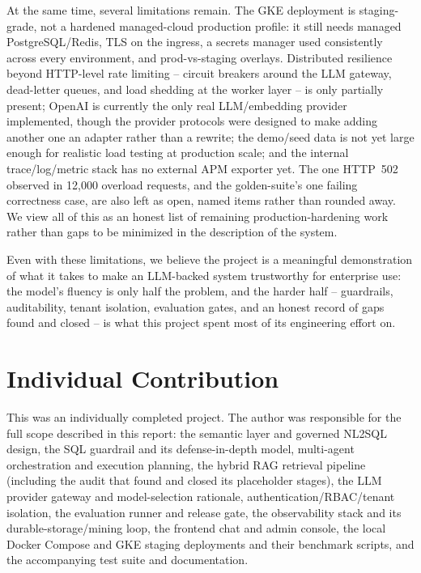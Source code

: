 \documentclass[conference]{IEEEtran}
\begin{document}
At the same time, several limitations remain. The GKE deployment is
staging-grade, not a hardened managed-cloud production profile: it still
needs managed PostgreSQL/Redis, TLS on the ingress, a secrets manager used
consistently across every environment, and prod-vs-staging overlays.
Distributed resilience beyond HTTP-level rate limiting -- circuit breakers
around the LLM gateway, dead-letter queues, and load shedding at the
worker layer -- is only partially present; OpenAI is currently the only
real LLM/embedding provider implemented, though the provider protocols
were designed to make adding another one an adapter rather than a
rewrite; the demo/seed data is not yet large enough for realistic
load testing at production scale; and the internal trace/log/metric stack
has no external APM exporter yet. The one HTTP~502 observed in 12{,}000
overload requests, and the golden-suite's one failing correctness case,
are also left as open, named items rather than rounded away. We view all
of this as an honest list of remaining production-hardening work rather
than gaps to be minimized in the description of the system.

Even with these limitations, we believe the project is a meaningful
demonstration of what it takes to make an LLM-backed system trustworthy
for enterprise use: the model's fluency is only half the problem, and the
harder half -- guardrails, auditability, tenant isolation, evaluation
gates, and an honest record of gaps found and closed -- is what this
project spent most of its engineering effort on.

\section{Individual Contribution}

This was an individually completed project. The author was responsible
for the full scope described in this report: the semantic layer and
governed NL2SQL design, the SQL guardrail and its defense-in-depth model,
multi-agent orchestration and execution planning, the hybrid RAG
retrieval pipeline (including the audit that found and closed its
placeholder stages), the LLM provider gateway and model-selection
rationale, authentication/RBAC/tenant isolation, the evaluation runner and
release gate, the observability stack and its durable-storage/mining
loop, the frontend chat and admin console, the local Docker Compose and
GKE staging deployments and their benchmark scripts, and the accompanying
test suite and documentation.
\end{document}
